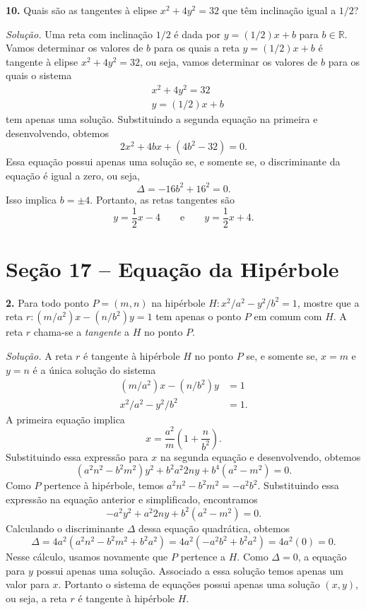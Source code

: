 \documentclass[a4paper,11pt]{article}
\newcommand{\R}{\mathbb{R}}
\begin{document}
\textbf{10.}
Quais são as tangentes à elipse $x^2 + 4y^2 = 32$ que têm inclinação igual a $1/2$?

\vspace{\baselineskip}

\emph{Solução.}
Uma reta com inclinação $1/2$ é dada por $y = (1/2)x + b$ para $b \in \R$.
Vamos determinar os valores de $b$ para os quais a reta $y = (1/2)x + b$ é tangente à elipse $x^2 + 4y^2 = 32$, ou seja, vamos determinar os valores de $b$ para os quais o sistema
\begin{align*}
  & x^2 + 4y^2 = 32 \\
  & y = (1/2)x + b
\end{align*}
tem apenas uma solução.
Substituindo a segunda equação na primeira e desenvolvendo, obtemos
\[
  2x^2 + 4bx + (4b^2 - 32) = 0.
\]
Essa equação possui apenas uma solução se, e somente se, o discriminante da equação é igual a zero, ou seja,
\[
  \Delta = -16b^2 + 16^2 = 0.
\]
Isso implica $b = \pm 4$.
Portanto, as retas tangentes são
\[
  y = \frac{1}{2} x - 4 \qquad \text{e} \qquad y = \frac{1}{2} x + 4.
\]

\section*{Seção 17 -- Equação da Hipérbole}

\textbf{2.}
Para todo ponto $P = (m,n)$ na hipérbole $H : x^2/a^2 - y^2/b^2 = 1$, mostre que a reta $r: (m/a^2)x - (n/b^2)y = 1$ tem apenas o ponto $P$ em comum com $H$.
A reta $r$ chama-se a \emph{tangente} a $H$ no ponto $P$.

\vspace{\baselineskip}

\emph{Solução.}
A reta $r$ é tangente à hipérbole $H$ no ponto $P$ se, e somente se, $x = m$ e $y = n$ é a única solução do sistema
\begin{align*}
  (m/a^2) x - (n/b^2) y & = 1 \\
  x^2/a^2 - y^2/b^2 & = 1.
\end{align*}
A primeira equação implica
\[
  x = \frac{a^2}{m} \left( 1 + \frac{n}{b^2} \right).
\]
Substituindo essa expressão para $x$ na segunda equação e desenvolvendo, obtemos
\[
  (a^2 n^2 - b^2 m^2) y^2 + b^2 a^2 2ny + b^4(a^2 - m^2) = 0.
\]
Como $P$ pertence à hipérbole, temos $a^2 n^2 - b^2 m^2 = -a^2 b^2$.
Substituindo essa expressão na equação anterior e simplificado, encontramos
\[
  -a^2 y^2 + a^2 2ny + b^2 (a^2 - m^2) = 0.
\]
Calculando o discriminante $\Delta$ dessa equação quadrática, obtemos
\[
  \Delta = 4 a^2 ( a^2 n^2 - b^2 m^2 + b^2 a^2 ) = 4 a^2 (-a^2 b^2 + b^2 a^2 ) = 4 a^2 (0) = 0.
\]
Nesse cálculo, usamos novamente que $P$ pertence a $H$.
Como $\Delta = 0$, a equação para $y$ possui apenas uma solução.
Associado a essa solução temos apenas um valor para $x$.
Portanto o sistema de equações possui apenas uma solução $(x,y)$, ou seja, a reta $r$ é tangente à hipérbole $H$.
\end{document}
